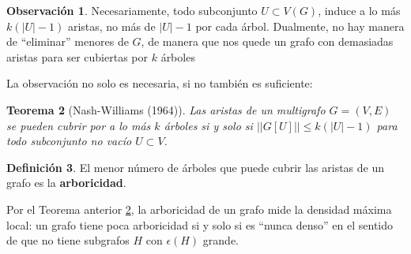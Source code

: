 \documentclass[12pt]{report}
\theoremstyle{plain}
\newtheorem{theorem}{Teorema}[section]
\theoremstyle{definition}
\newtheorem{definition}[theorem]{Definición}
\newtheorem{obs}[theorem]{Observación}
\newcommand{\abs}[1]{\left \vert #1 \right \vert}
\newcommand{\Abs}[1]{\left \vert \left \vert #1 \right \vert \right \vert}
\begin{document}
\begin{obs}
Necesariamente, todo subconjunto $U \subset V(G)$, induce a lo más $k(\abs U -1)$ aristas, no más de $\abs U -1$ por cada árbol. Dualmente, no hay manera de ``eliminar'' menores de $G$, de manera que nos quede un grafo con demasiadas aristas para ser cubiertas por $k$ árboles
\end{obs}
La observación no solo es necesaria, si no también es suficiente:

\begin{theorem}[Nash-Williams (1964)]\label{th:nash-williams-arboricidad}
Las aristas de un multigrafo $G = (V,E)$ se pueden cubrir por a lo más $k$ árboles si y solo si $\Abs {G[U]} \leq k (\abs U - 1)$ para todo subconjunto no vacío $U \subset V$.
\end{theorem}

\begin{definition}
El menor número de árboles que puede cubrir las aristas de un grafo es la \textbf{arboricidad}.
\end{definition}
Por el Teorema anterior \ref{th:nash-williams-arboricidad}, la arboricidad de un grafo mide la densidad máxima local: un grafo tiene poca arboricidad si y solo si es ``nunca denso'' en el sentido de que no tiene subgrafos $H$ con $\epsilon (H)$ grande.
\end{document}
